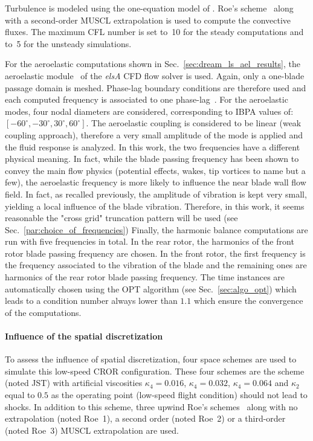 Turbulence is modeled using the one-equation model of
\citet{Spalart1992}.  Roe's scheme~\cite{Roe1981} along with a 
second-order MUSCL extrapolation 
is used to compute the convective fluxes.
The maximum CFL number is set to~10 for the steady 
computations and to~5 for the unsteady simulations.

For the aeroelastic computations shown in
Sec.~\ref{sec:dream_ls_ael_results}, 
the aeroelastic module~\cite{CIDugeai2011} 
of the \emph{elsA} CFD flow solver is used.
Again, only a one-blade passage domain is meshed.
Phase-lag boundary conditions are therefore used
and each computed frequency is associated to one phase-lag~\cite{ThesisGuedeney}.
For the aeroelastic modes, 
four nodal diameters are considered, corresponding to IBPA
values of: $[-60^\circ, -30^\circ, 30^\circ, 60^\circ]$. 
The aeroelastic coupling is considered to be linear (weak coupling
approach), therefore a very small amplitude of the mode is applied
and the fluid response is analyzed.
In this work, the two frequencies 
have a different physical meaning. In fact, while the blade passing frequency
has been shown to convey the main flow physics (potential effects, wakes, 
tip vortices to name but a few), the aeroelastic frequency is more likely
to influence the near blade wall flow field. In fact, as recalled
previously, the amplitude of vibration is kept very small,
yielding a local influence of the blade vibration.
Therefore, in this work, it seems reasonable the "cross grid"
truncation pattern will be used (see Sec.~\ref{par:choice_of_frequencies})
Finally, the harmonic balance computations are run with
five frequencies in total. In the rear rotor,
the harmonics of the front rotor blade passing frequency
are chosen. In the front rotor, the first frequency is the
frequency associated to the vibration of the blade and the
remaining ones are harmonics of the rear rotor blade 
passing frequency.
The time instances are automatically chosen using the OPT
algorithm (see Sec.~\ref{sec:algo_opt}) which leads to 
a condition number always lower than $1.1$ which ensure
the convergence of the computations.

\paragraph{Influence of the spatial discretization}
\label{sub:dream_ls_spatial_discretization}

To assess the influence of spatial discretization, four 
space schemes are used to simulate this low-speed CROR configuration.
These four schemes are the \citet{Jameson1981} scheme (noted JST) with artificial
viscosities $\kappa_4 = 0.016$, $\kappa_4 = 0.032$, $\kappa_4 = 0.064$
and $\kappa_2$ equal to $0.5$ as the operating point (low-speed
flight condition) should not 
lead to shocks. In addition to this scheme, three upwind
Roe's schemes~\cite{Roe1981} along with no extrapolation (noted Roe~1),
a second order (noted Roe~2) or a third-order (noted Roe~3) 
MUSCL extrapolation are used.

